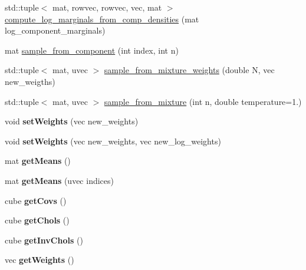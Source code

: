 \begin{DoxyCompactItemize}
\item 
std\+::tuple$<$ mat, rowvec, rowvec, vec, mat $>$ \hyperlink{classGMM_a03b69ac93de1b177102fc9378665f20b}{compute\+\_\+log\+\_\+marginals\+\_\+from\+\_\+comp\+\_\+densities} (mat log\+\_\+component\+\_\+marginals)
\item 
mat \hyperlink{classGMM_a5e5c1278fc67c3cb4b5cdeeb9390ab98}{sample\+\_\+from\+\_\+component} (int index, int n)
\item 
std\+::tuple$<$ mat, uvec $>$ \hyperlink{classGMM_ad7687ba93ab195673c26d02690d14d27}{sample\+\_\+from\+\_\+mixture\+\_\+weights} (double N, vec new\+\_\+weigths)
\item 
std\+::tuple$<$ mat, uvec $>$ \hyperlink{classGMM_afb3f91ba6e939739198a49c85c92ace4}{sample\+\_\+from\+\_\+mixture} (int n, double temperature=1.)
\item 
void {\bfseries set\+Weights} (vec new\+\_\+weights)\hypertarget{classGMM_a1326b4c55a66445adb3888d1a77bb2cb}{}\label{classGMM_a1326b4c55a66445adb3888d1a77bb2cb}

\item 
void {\bfseries set\+Weights} (vec new\+\_\+weights, vec new\+\_\+log\+\_\+weights)\hypertarget{classGMM_a79c00e9de57111610b41fd98577b7b6a}{}\label{classGMM_a79c00e9de57111610b41fd98577b7b6a}

\item 
mat {\bfseries get\+Means} ()\hypertarget{classGMM_ae14f838f611896e02074e897247f461b}{}\label{classGMM_ae14f838f611896e02074e897247f461b}

\item 
mat {\bfseries get\+Means} (uvec indices)\hypertarget{classGMM_adeb0e2fd08493b3fd182286566a27a89}{}\label{classGMM_adeb0e2fd08493b3fd182286566a27a89}

\item 
cube {\bfseries get\+Covs} ()\hypertarget{classGMM_a88fd853731318d167e32b220debcf3c8}{}\label{classGMM_a88fd853731318d167e32b220debcf3c8}

\item 
cube {\bfseries get\+Chols} ()\hypertarget{classGMM_a84da191cb14375e572f192322b35ac6a}{}\label{classGMM_a84da191cb14375e572f192322b35ac6a}

\item 
cube {\bfseries get\+Inv\+Chols} ()\hypertarget{classGMM_a0cede71e7f6fb12cc7710567a3f4feef}{}\label{classGMM_a0cede71e7f6fb12cc7710567a3f4feef}

\item 
vec {\bfseries get\+Weights} ()\hypertarget{classGMM_a23d3f84a62535b3fbb3ef5cf9385f58b}{}\label{classGMM_a23d3f84a62535b3fbb3ef5cf9385f58b}


\end{DoxyCompactItemize}
